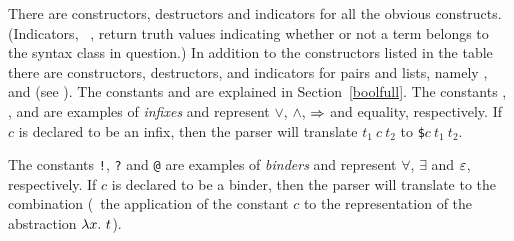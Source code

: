 There are constructors, destructors and indicators for all the obvious
constructs. (Indicators, \eg\ , return truth values
indicating whether or not a term belongs to the syntax class in
question.) In addition to the constructors listed in the table there
are constructors, destructors, and indicators for pairs and lists,
namely ,
%
%
%
%
and 
%
%
(see \REFERENCE).  The constants
%
%
and  are explained in Section~\ref{boolfull}.  The
constants \holtxt{\bs/},
%
%
\holtxt{/\bs}, \holtxt{==>} and \holtxt{=} are examples of
\textit{infixes} and represent $\vee$, $\wedge$, $\Rightarrow$ and equality,
respectively. If $c$ is declared to be an infix, then the \HOL{}
parser will translate $t_1\ c\ t_2$ to {\small\verb+$+}$c\ t_1\ t_2$.

The constants {\small\verb+!+}, {\small\verb+?+} and {\small\verb+@+}
are examples of \label{binder} \textit{binders}
%
%
and represent $\forall$, $\exists$ and $\varepsilon$, respectively.  If
$c$ is declared to be a binder, then the \HOL{} parser will translate
 to the combination 
(\ie\ the application of the constant $c$ to the representation of the
abstraction $\lambda x.\ t$).

